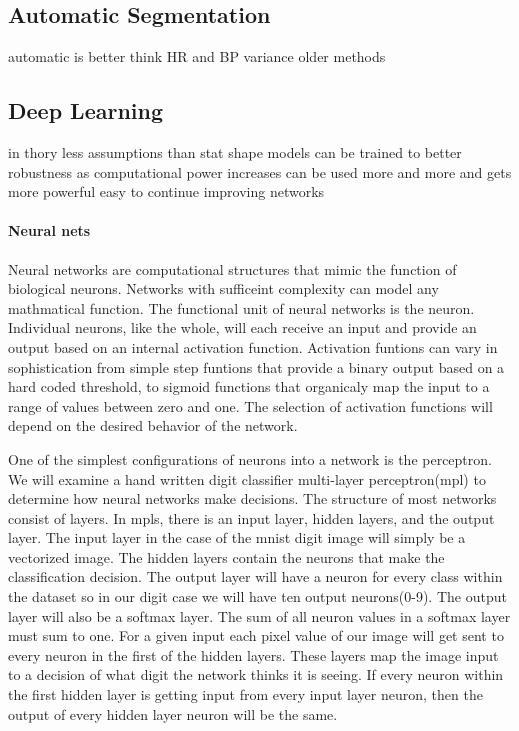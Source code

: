 \documentclass{article}
\begin{document}
\subsection{Automatic Segmentation}
automatic is better think HR and BP
variance
older methods
\subsection{Deep Learning}
in thory less assumptions than stat shape models
can be trained to better robustness
as computational power increases can be used more and more and gets more powerful
easy to continue improving networks
\paragraph{Neural nets}
Neural networks are computational structures that mimic the function of biological neurons. Networks with sufficeint complexity can model any mathmatical function. 
The functional unit of neural networks is the neuron.
Individual neurons, like the whole, will each receive an input and provide an output based on an internal activation function.
Activation funtions can vary in sophistication from simple step funtions that provide a binary output based on a hard coded threshold,
to sigmoid functions that organicaly map the input to a range of values between zero and one.
The selection of activation functions will depend on the desired behavior of the network. 
\par
One of the simplest configurations of neurons into a network is the perceptron.
We will examine a hand written digit classifier multi-layer perceptron(mpl) to determine how neural networks make decisions.
The structure of most networks consist of layers. In mpls, there is an input layer, hidden layers, and the output layer. 
The input layer in the case of the mnist digit image will simply be a vectorized image. The hidden layers contain the neurons that make the classification decision.
The output layer will have a neuron for every class within the dataset so in our digit case we will have ten output neurons(0-9). The output layer will also be a softmax layer. 
The sum of all neuron values in a softmax layer must sum to one.
For a given input each pixel value of our image will get sent to every neuron in the first of the hidden layers.
These layers map the image input to a decision of what digit the network thinks it is seeing.
If every neuron within the first hidden layer is getting input from every input layer neuron, then the output of every hidden layer neuron will be the same. 
\end{document}
